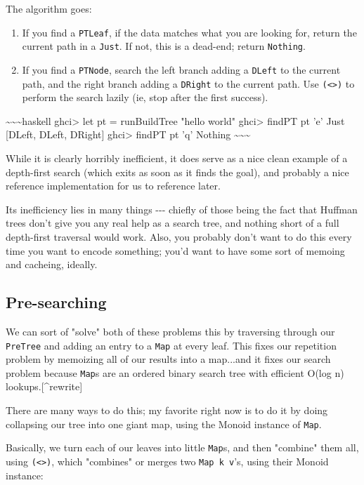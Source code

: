 \documentclass[]{article}
\begin{document}
The algorithm goes:

\begin{enumerate}
\item
  If you find a \texttt{PTLeaf}, if the data matches what you are looking for,
  return the current path in a \texttt{Just}. If not, this is a dead-end; return
  \texttt{Nothing}.
\item
  If you find a \texttt{PTNode}, search the left branch adding a \texttt{DLeft}
  to the current path, and the right branch adding a \texttt{DRight} to the
  current path. Use \texttt{(\textless{}\textbar{}\textgreater{})} to perform
  the search lazily (ie, stop after the first success).
\end{enumerate}

\textasciitilde{}\textasciitilde{}\textasciitilde{}haskell ghci\textgreater{}
let pt = runBuildTree "hello world" ghci\textgreater{} findPT pt 'e' Just
{[}DLeft, DLeft, DRight{]} ghci\textgreater{} findPT pt 'q' Nothing
\textasciitilde{}\textasciitilde{}\textasciitilde{}

While it is clearly horribly inefficient, it does serve as a nice clean example
of a depth-first search (which exits as soon as it finds the goal), and probably
a nice reference implementation for us to reference later.

Its inefficiency lies in many things -\/-\/- chiefly of those being the fact
that Huffman trees don't give you any real help as a search tree, and nothing
short of a full depth-first traversal would work. Also, you probably don't want
to do this every time you want to encode something; you'd want to have some sort
of memoing and cacheing, ideally.

\subsection{Pre-searching}

We can sort of "solve" both of these problems this by traversing through our
\texttt{PreTree} and adding an entry to a \texttt{Map} at every leaf. This fixes
our repetition problem by memoizing all of our results into a map...and it fixes
our search problem because \texttt{Map}s are an ordered binary search tree with
efficient O(log n) lookups.{[}\^{}rewrite{]}

There are many ways to do this; my favorite right now is to do it by doing
collapsing our tree into one giant map, using the Monoid instance of
\texttt{Map}.

Basically, we turn each of our leaves into little \texttt{Map}s, and then
"combine" them all, using \texttt{(\textless{}\textgreater{})}, which "combines"
or merges two \texttt{Map\ k\ v}'s, using their Monoid instance:
\end{document}

